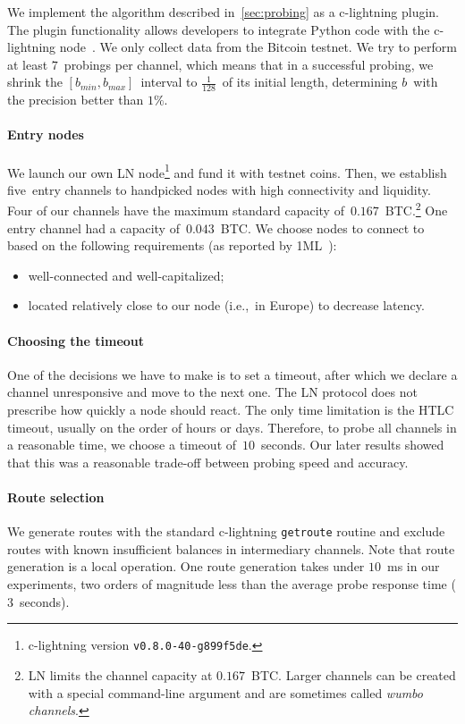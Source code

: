 We implement the algorithm described in~\cref{sec:probing} as a c-lightning plugin.
The plugin functionality allows developers to integrate Python code with the c-lightning node~\cite{clightningPlugins}.
We only collect data from the Bitcoin testnet.
We try to perform at least $7$~probings per channel, which means that in a successful probing, we shrink the $[b_{min}, b_{max}]$~interval to $\frac{1}{128}$~of its initial length, determining $b$~with the precision better than $1\%$.

\paragraph{Entry nodes}
We launch our own LN node\footnote{c-lightning version \texttt{v0.8.0-40-g899f5de}.} and fund it with testnet coins.
Then, we establish five~entry channels to handpicked nodes with high connectivity and liquidity.
Four of our channels have the maximum standard capacity of~$0.167$~BTC\@.\footnote{LN limits the channel capacity at $0.167$~BTC\@. Larger channels can be created with a special command-line argument and are sometimes called \textit{wumbo channels}.}
One entry channel had a capacity of~$0.043$~BTC\@.
We choose nodes to connect to based on the following requirements (as reported by 1ML~\cite{1MLTopConnected}):
\begin{itemize}
	\item well-connected and well-capitalized;
	\item located relatively close to our node (i.e.,~in Europe) to decrease latency.
\end{itemize}

\paragraph{Choosing the timeout}
One of the decisions we have to make is to set a timeout, after which we declare a channel unresponsive and move to the next one.
The LN protocol does not prescribe how quickly a node should react.
The only time limitation is the HTLC timeout, usually on the order of hours or days.
Therefore, to probe all channels in a reasonable time, we choose a timeout of~$10$~seconds.
Our later results showed that this was a reasonable trade-off between probing speed and accuracy.

\paragraph{Route selection}
We generate routes with the standard c-lightning \texttt{getroute} routine and exclude routes with known insufficient balances in intermediary channels.
Note that route generation is a local operation.
One route generation takes under $10$~ms in our experiments, two orders of magnitude less than the average probe response time ($3$~seconds).

